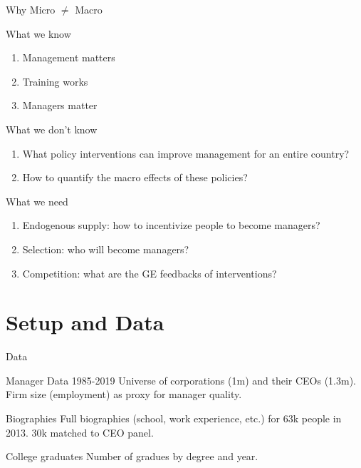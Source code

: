 \documentclass[
  ignorenonframetext,
  aspectratio=1610,
]{beamer}
\providecommand{\tightlist}{%
  \setlength{\itemsep}{0pt}\setlength{\parskip}{0pt}}
\begin{document}
\begin{frame}{Why Micro \(\neq\) Macro}
\protect\hypertarget{why-micro-neq-macro}{}
\begin{block}{What we know}
\protect\hypertarget{what-we-know}{}
\begin{enumerate}
\tightlist
\item
  Management matters
\item
  Training works
\item
  Managers matter
\end{enumerate}

\pause
\end{block}

\begin{block}{What we don't know}
\protect\hypertarget{what-we-dont-know}{}
\begin{enumerate}
\tightlist
\item
  What policy interventions can improve management for an entire
  country?
\item
  How to quantify the macro effects of these policies?
\end{enumerate}

\pause
\end{block}

\begin{block}{What we need}
\protect\hypertarget{what-we-need}{}
\begin{enumerate}
\tightlist
\item
  Endogenous supply: how to incentivize people to become managers?
\item
  Selection: who will become managers?
\item
  Competition: what are the GE feedbacks of interventions?
\end{enumerate}
\end{block}
\end{frame}

\section{Setup and Data}\label{setup-and-data}

\begin{frame}{Data}
\protect\hypertarget{data}{}
\begin{block}{Manager Data 1985-2019}
\protect\hypertarget{manager-data-1985-2019}{}
Universe of corporations (1m) and their CEOs (1.3m). Firm size
(employment) as proxy for manager quality.
\end{block}

\begin{block}{Biographies}
\protect\hypertarget{biographies}{}
Full biographies (school, work experience, etc.) for 63k people in 2013.
30k matched to CEO panel.
\end{block}

\begin{block}{College graduates}
\protect\hypertarget{college-graduates}{}
Number of gradues by degree and year.
\end{block}
\end{frame}
\end{document}
